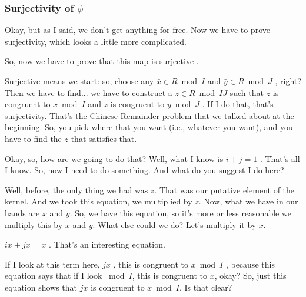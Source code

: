 \begin{proofWrapper}
\subsubsection{Surjectivity of \texorpdfstring{$\phi$}{phi}}

\begin{speech}[00:09:25 - 00:11:15]
Okay, but as I said, we don't get anything for free. Now we have to prove surjectivity, which looks a little more complicated.

So, now we have to prove that this map is surjective .

Surjective means we start: so, choose any $\bar{x} \in R \bmod I$ and $\bar{y} \in R \bmod J$ , right? Then we have to find... we have to construct a $\bar{z} \in R \bmod IJ$ such that  $z$ is congruent to $x \bmod I$ and $z$ is congruent to $y \bmod J$ . If I do that, that's surjectivity. That's the Chinese Remainder problem that we talked about at the beginning. So, you pick where that you want (i.e., whatever you want), and you have to find the $z$ that satisfies that.

Okay, so, how are we going to do that? Well, what I know is $i + j = 1$ . That's all I know. So, now I need to do something. And what do you suggest I do here?

Well, before, the only thing we had was $z$. That was our putative element of the kernel. And we took this equation, we multiplied by $z$. Now, what we have in our hands are $x$ and $y$. So, we have this equation, so it's more or less reasonable we multiply this by $x$ and $y$. What else could we do? Let's multiply it by $x$.
\end{speech}

\begin{speech}[00:11:15 - 00:12:57]
$ix + jx = x$ . That's an interesting equation.

If I look at this term here, $jx$ , this is congruent to $x \bmod I$ , because this equation says that if I look $\bmod I$, this is congruent to $x$, okay? So, just this equation shows that $jx$ is congruent to $x \bmod I$. Is that clear?


\end{speech}
\end{proofWrapper}
